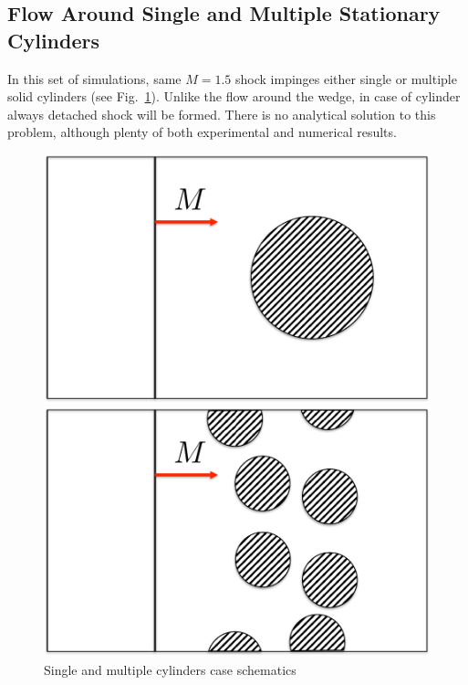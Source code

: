 \subsection{Flow Around Single and Multiple Stationary Cylinders}
In this set of simulations, same $M=1.5$ shock impinges either single or multiple solid cylinders (see Fig.~\ref{fig:cyl_scheme}). Unlike the flow around the wedge, in case of cylinder always detached shock will be formed. There is no analytical solution to this problem, although plenty of both experimental and numerical results.
\begin{figure}[h!]
\begin{minipage}{0.5\linewidth}
\includegraphics[scale=0.4]{fig/single_cyl.pdf}
\end{minipage}
\begin{minipage}{0.5\linewidth}
\includegraphics[scale=0.4]{fig/mul_cyl.pdf}
\end{minipage}
\caption{Single and multiple cylinders case schematics} \label{fig:cyl_scheme}
\end{figure}

{\color{red}{All of our results here, for cylinders, wedge, etc, split by subsections}}






